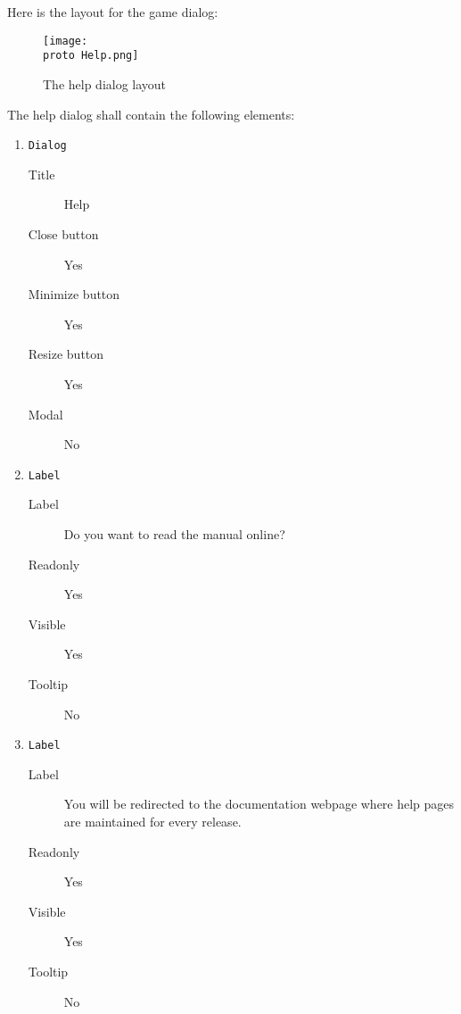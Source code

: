Here is the layout for the game dialog:

\begin{figure}[H]
  \texttt{[image: \\proto Help.png]}
  \caption{The help dialog layout}
  \label{fig:HelpDlgLayout}
\end{figure}

The help dialog shall contain the following elements:

\begin{enumerate}

    \item \texttt{Dialog}
              \begin{description}
                  \item[Title] Help
                  \item[Close button] Yes
                  \item[Minimize button] Yes
                  \item[Resize button] Yes
                  \item[Modal] No
              \end{description}

    \item \texttt{Label}
              \begin{description}
                  \item[Label] Do you want to read the manual online?
                  \item[Readonly] Yes
                  \item[Visible] Yes
                  \item[Tooltip] No
              \end{description}

    \item \texttt{Label}
              \begin{description}
                  \item[Label] You will be redirected to the documentation webpage
                               where help pages are maintained for every release.
                  \item[Readonly] Yes
                  \item[Visible] Yes
                  \item[Tooltip] No
              \end{description}


\end{enumerate}
